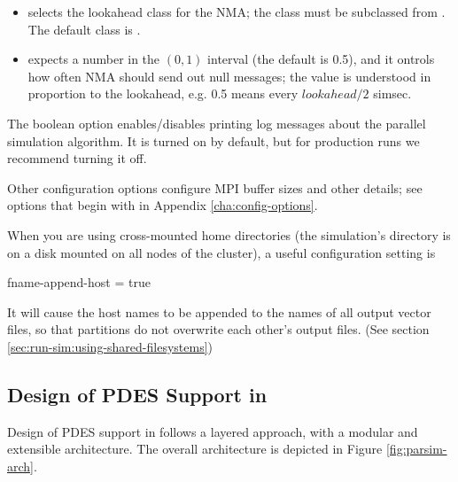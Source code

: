 \begin{itemize}
  \item {}
    selects the lookahead class for the NMA; the class must be subclassed
    from . The default class is .

  \item {} expects a number
    in the $(0,1)$ interval (the default is 0.5), and it ontrols how often
    NMA should send out null messages; the value is understood in proportion
    to the lookahead, e.g. 0.5 means every $lookahead/2$ simsec.
\end{itemize}

The  boolean option enables/disables printing
log messages about the parallel simulation algorithm. It is turned on
by default, but for production runs we recommend turning it off.

Other configuration options configure MPI buffer sizes and other details;
see options that begin with  in Appendix \ref{cha:config-options}.


When you are using cross-mounted home directories (the simulation's
directory is on a disk mounted on all nodes of the cluster),
a useful configuration setting is

\begin{inifile}
[General]
fname-append-host = true
\end{inifile}

It will cause the host names to be appended to the names of
all output vector files, so that partitions do not overwrite each other's
output files. (See section \ref{sec:run-sim:using-shared-filesystems})





\subsection{Design of PDES Support in {\opp}}

Design of PDES support in {\opp} follows a layered approach,
with a modular and extensible architecture. The overall
architecture is depicted in Figure \ref{fig:parsim-arch}.

